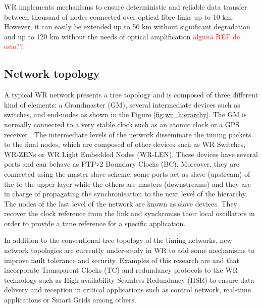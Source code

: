 WR implements mechanisms to ensure deterministic and reliable data transfer
between thousand of nodes connected over optical fibre links up to 10 km.
However, it can easily be extended up to 50 km without significant degradation
and up to 120 km without the needs of optical amplification \textcolor{red}{alguna REF de esto??}. 

\subsection{Network topology} \label{subsec:wr-net}

A typical WR network presents a tree topology and is composed of three different
kind of elements: a Grandmaster (GM), several intermediate devices such as
switches, and end-nodes as shown in the Figure \ref{fig:wr_hierarchy}. The GM
is normally connected to a very stable clock such as an atomic clock or a GPS
receiver \cite{Daniluk2012}. The intermediate levels of the network disseminate
the timing packets to the final nodes, which are composed of other devices such
as WR Switches, WR-ZENs or WR Light Embedded Nodes (WR-LEN). These devices have
several ports and can behave as PTPv2 Boundary Clocks (BC). Moreover, they are
connected using the master-slave scheme: some ports act as slave (upstream)
of the to the upper layer while the others are masters (downstreams) and
they are in charge of propagating the synchronisation to the next level of the
hierarchy. The nodes of the last level of the network are known as slave devices.
They recover the clock reference from the link and synchronise their local
oscillators in order to provide a time reference for a specific application.

In addition to the conventional tree topology of the timing networks, new
network topologies are currently under-study in WR to add some mechanisms to improve fault
tolerance and security. Examples of this research are
\cite{jlgutierrez-paper-redundancy} and \cite{jlgutierrezhsr} that incorporate Transparent Clocks
(TC) and redundancy protocols to the WR technology such as
High-availability Seamless Redundancy (HSR) to ensure data delivery and reception in critical applications such as
control network, real-time applications or Smart Grids among others.

